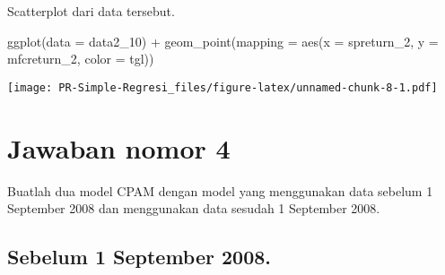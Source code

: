 \documentclass[
]{article}
\newenvironment{Shaded}{\begin{snugshade}}{\end{snugshade}}
\newcommand{\AttributeTok}[1]{\textcolor[rgb]{0.77,0.63,0.00}{#1}}
\newcommand{\DecValTok}[1]{\textcolor[rgb]{0.00,0.00,0.81}{#1}}
\newcommand{\FunctionTok}[1]{\textcolor[rgb]{0.00,0.00,0.00}{#1}}
\newcommand{\NormalTok}[1]{#1}
\newcommand{\OtherTok}[1]{\textcolor[rgb]{0.56,0.35,0.01}{#1}}
\newcommand{\SpecialCharTok}[1]{\textcolor[rgb]{0.00,0.00,0.00}{#1}}
\begin{document}
Scatterplot dari data tersebut.

\begin{Shaded}
\begin{Highlighting}[]
\FunctionTok{ggplot}\NormalTok{(}\AttributeTok{data =}\NormalTok{ data2\_10) }\SpecialCharTok{+} \FunctionTok{geom\_point}\NormalTok{(}\AttributeTok{mapping =} \FunctionTok{aes}\NormalTok{(}\AttributeTok{x =}\NormalTok{ spreturn\_2, }\AttributeTok{y =}\NormalTok{ mfcreturn\_2, }\AttributeTok{color =}\NormalTok{ tgl))}
\end{Highlighting}
\end{Shaded}

\texttt{[image: PR-Simple-Regresi\_files/figure-latex/unnamed-chunk-8-1.pdf]}

\hypertarget{jawaban-nomor-4}{%
\section{Jawaban nomor 4}\label{jawaban-nomor-4}}

Buatlah dua model CPAM dengan model yang menggunakan data sebelum 1
September 2008 dan menggunakan data sesudah 1 September 2008.

\hypertarget{sebelum-1-september-2008.}{%
\subsection{Sebelum 1 September 2008.}\label{sebelum-1-september-2008.}}

\begin{Shaded}
\end{Shaded}
\end{document}
